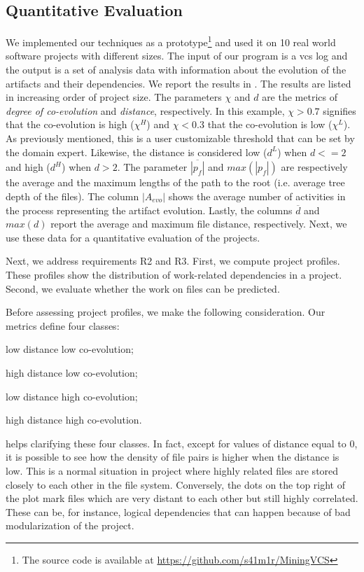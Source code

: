 \subsection{Quantitative Evaluation}
\label{subsec:quantitative-eval}

We implemented our techniques as a prototype\footnote{The source code is available at \url{https://github.com/s41m1r/MiningVCS}} and used it on 10 real world software projects with different sizes. The input of our program is a \gls{vcs} log and the output is a set of analysis data with information about the evolution of the artifacts and their dependencies. We report the results in . The results are listed in increasing order of project size. The parameters $\chi$ and $d$ are the metrics of \emph{degree of co-evolution} and \emph{distance}, respectively. In this example, $\chi > 0.7$ signifies that the co-evolution is high ($\chi^{H}$) and $\chi < 0.3$ that the co-evolution is low ($\chi^{L}$). As previously mentioned, this is a user customizable threshold that can be set by the domain expert. Likewise, the distance is considered low ($d^{L}$) when $d<=2$ and high ($d^{H}$) when $d>2$. The parameter  $\overline{|p_f|}$ and {$max(|p_{f}|)$} are respectively the average and the maximum lengths of the path to the root (i.e. average tree depth of the files). The column {$|A_{evo}|$} shows the average number of activities in the process representing the artifact evolution. Lastly, the columns {$\overline{d}$} and {$max(d)$} report the average and maximum file distance, respectively. Next, we use these data for a quantitative evaluation of the projects.




Next, we address requirements R2 and R3. First, we compute project profiles. These profiles show the distribution of work-related dependencies in a project. Second, we evaluate whether the work on files can be predicted.

Before assessing project profiles, we make the following consideration. Our metrics define four classes:
\begin{inparaenum}[\itshape i)]
	\item low distance low co-evolution;
	\item high distance low co-evolution;
	\item low distance high co-evolution;
	\item high distance high co-evolution.
\end{inparaenum}  helps clarifying these four classes. In fact, except for values of distance equal to 0, it is possible to see how the density of file pairs is higher when the distance is low. This is a normal situation in project where highly related files are stored closely to each other in the file system. Conversely, the dots on the top right of the plot mark files which are very distant to each other but still highly correlated. These can be, for instance, logical dependencies that can happen because of bad modularization of the project.


